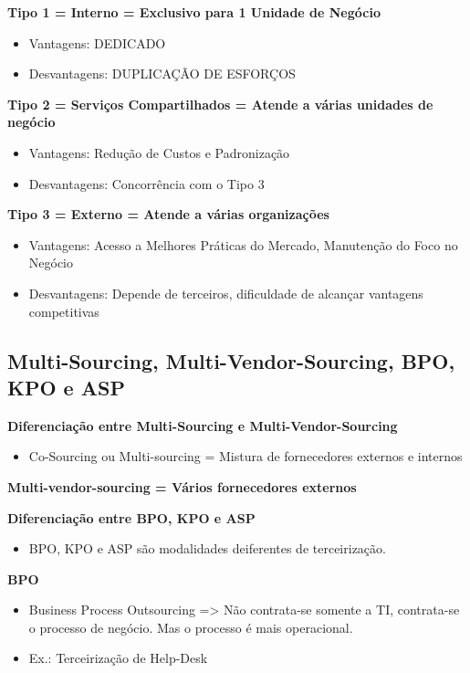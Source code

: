 \textbf{Tipo 1 = Interno = Exclusivo para 1 Unidade de Negócio}
\begin{itemize}
	\item Vantagens:  DEDICADO
	\item Desvantagens: DUPLICAÇÃO DE ESFORÇOS
\end{itemize}

\textbf{Tipo 2 = Serviços Compartilhados = Atende a várias unidades de negócio}
\begin{itemize}
	\item Vantagens:  Redução de Custos e Padronização
	\item Desvantagens: Concorrência com o Tipo 3
\end{itemize}

\textbf{Tipo 3 = Externo = Atende a várias organizações}
\begin{itemize}
	\item Vantagens:  Acesso a Melhores Práticas do Mercado, Manutenção do Foco no Negócio
	\item Desvantagens: Depende de terceiros, dificuldade de alcançar vantagens competitivas
\end{itemize}


\subsection{Multi-Sourcing, Multi-Vendor-Sourcing, BPO, KPO e ASP}

\textbf{Diferenciação entre Multi-Sourcing e Multi-Vendor-Sourcing}
\begin{itemize}
	\item Co-Sourcing ou Multi-sourcing = Mistura de fornecedores externos e internos
\end{itemize}

\textbf{Multi-vendor-sourcing = Vários fornecedores externos}

\textbf{Diferenciação entre BPO, KPO e ASP}
\begin{itemize}
	\item BPO, KPO e ASP são modalidades deiferentes de terceirização.
\end{itemize}

\textbf{BPO}
\begin{itemize}
	\item Business Process Outsourcing => Não contrata-se somente a TI, contrata-se o processo de negócio. Mas o processo é mais operacional.
	\item Ex.: Terceirização de Help-Desk
\end{itemize}

